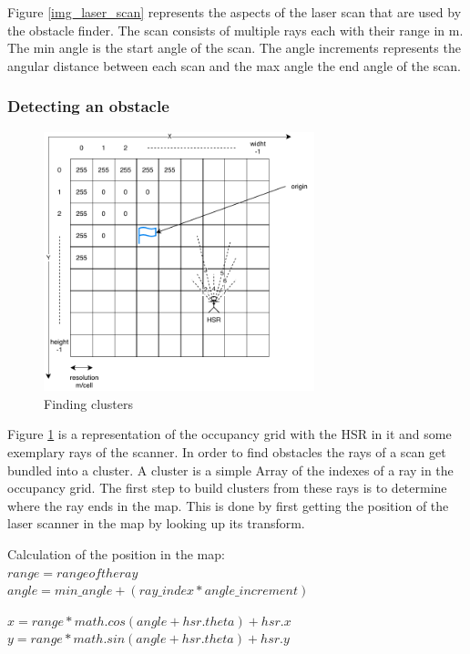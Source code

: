 \documentclass[main.tex]{subfiles}
\begin{document}
		Figure \ref{img_laser_scan} represents the  aspects of the laser scan that are used by the obstacle finder. The scan consists of multiple rays each with their range in m. The min angle is the start angle of the scan. The angle increments represents the angular distance between each scan and the max angle the end angle of the scan.
		
		\subsubsection{Detecting an obstacle}
		
		\begin{figure}[H]
			\centering
			\includegraphics[width=0.7\textwidth]{pictures/obstacle_finder/Cluster-building.pdf}
			\caption{Finding clusters}
			\label{img_finding_cluster}
		\end{figure}   
	
		Figure \ref{img_finding_cluster} is a representation of the occupancy grid with the HSR in it and some exemplary rays of the scanner. In order to find obstacles the rays of a scan get bundled into a cluster. A cluster is a simple Array of the indexes of a ray in the occupancy grid.
		The first step to build clusters from these rays is to determine where the ray ends in the map. This is done by first getting the position of the laser scanner in the map by looking up its transform.
		
		Calculation of the position in the map:\\		
		$range = range of the ray$\\
		$angle = min\_angle + (ray\_index * angle\_increment)$
		
		$x = range * math.cos(angle + hsr.theta) + hsr.x$\\
		$y = range * math.sin(angle + hsr.theta) + hsr.y$\\
		
\end{document}
